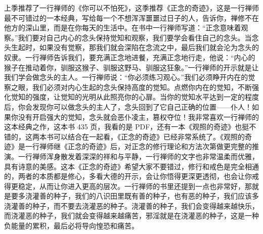 \begin{book}
    上季推荐了一行禅师的《你可以不怕死》，这季推荐《正念的奇迹》，这是一行禅师最不可错过的一本经典，写给每一个不想浑浑噩噩过日子的人，告诉你，禅修不在他方的深山里，而是在你每天的生活中。在书中一行禅师写道：“正念意味着观察。”我们要对自己内心的念头保持觉知和观察，我们要学会看住自己的念头。当念头生起时，如果没有觉察，那我们就会深陷在念流之中，最后我们就会沦为念头的奴隶。一行禅师告诉我们，要充满正念地进餐，充满正念地行走，他说：“内心的猴子在推动着你，驯服这猴子、驯服这野马、驯服这狂象。”一行禅师的开示就是让我们学会做念头的主人。一行禅师说：“你必须练习观心。”我们必须睁开内在的觉察之眼，我们必须对内心生起的念头保持高度的觉知。点燃你内在的觉知，不断强化觉知的强度，让觉知的光明从此照亮你的心扉。当你的觉知水平达到一定的程度后，你会发现你可以做念头的主人了，念头回到了它自己正确的位置——仆人！如果你没有开启强大的觉知，念头就会恶仆凌主，篡权夺位！我非常喜欢一行禅师的这本经典之作，这本书 435 页，我看的是 PDF，还有一本《观照的奇迹》也挺不错的，这两本书可以结合在一起看，《正念的奇迹》已经非常系统了。《观照的奇迹》是一行禅师继《正念的奇迹》后，对正念的修行理论和方法次第做更完整的推演。一行禅师浑身散发着深深的祥和与平静，一行禅师的文字也非常温柔而优雅，具有诗意的美感。这本《正念的奇迹》希望大家不要错过，修行和戒色是完全相通的，两者的本质都是修心，多看大德的开示，会让你悟得更深更透彻，也会让你戒得更稳定，从而让你进入更高的层次。一行禅师的书里还提到一点也非常好，那就是要多浇灌善的种子，我们的八识田里既有善的种子，也有恶的种子，我们应该多浇灌善的种子，而不要去浇灌恶的种子。浇灌善的种子，我们会变得越来越快乐，而浇灌恶的种子，我们就会变得越来越痛苦，邪淫就是在浇灌恶的种子，这是一种负能量的累积，最后必将导向惶恐和痛苦。
\end{book}
